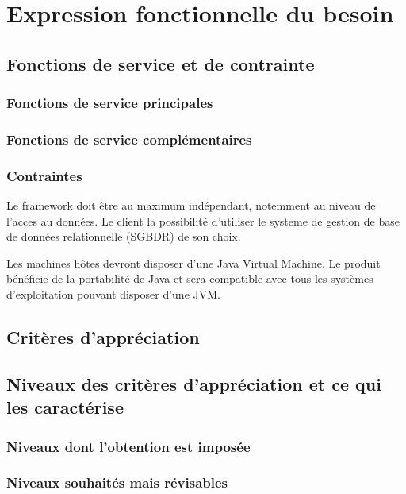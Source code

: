 \section{Expression fonctionnelle du besoin}

\subsection{Fonctions de service et de contrainte}
\subsubsection{Fonctions de service principales}
\subsubsection{Fonctions de service complémentaires}
\subsubsection{Contraintes}
Le framework doit être au maximum indépendant, notemment au niveau de l'acces au données.
Le client la possibilité d'utiliser le systeme de gestion de base de données relationnelle (SGBDR) de son choix.

Les machines hôtes devront disposer d'une Java Virtual Machine.
Le produit bénéficie de la portabilité de Java et sera compatible avec tous les systèmes
d'exploitation pouvant disposer d'une JVM.

\subsection{Critères d’appréciation}

\subsection{Niveaux des critères d’appréciation et ce qui les caractérise}
\subsubsection{Niveaux dont l’obtention est imposée}
\subsubsection{Niveaux souhaités mais révisables}
